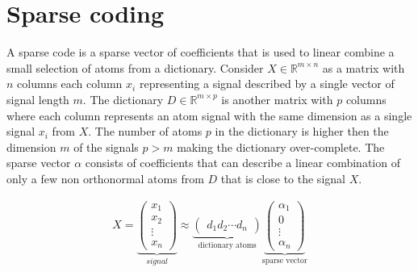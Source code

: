 \chapter{Sparse coding}
\label{chap:sparse_coding}


A sparse code is a sparse vector of coefficients that is used 
to linear combine a small selection of atoms from a dictionary.
Consider $X \in \mathbb{R}^{m\times n}$  as a matrix with $n$ columns each
column $x_{i}$ representing a signal described by a single vector of
signal length $m$. The dictionary $D\in\mathbb{R}^{m \times p}$ is another
matrix with $p$ columns where each column represents an atom signal with the
same dimension as a single signal $x_{i}$ from $X$. The number of 
atoms $p$ in the dictionary is higher then the dimension $m$ of the signals
$p > m$ making the dictionary over-complete. The sparse vector $\alpha$ consists
of coefficients that can describe a linear combination of only a few non
orthonormal atoms from $D$ that is close to the signal $X$. 

\begin{align}
X = \underbrace{\begin{pmatrix} x_1 \\ x_2 \\ \vdots \\ x_n
\end{pmatrix}}_{signal}
\approx \underbrace{\begin{pmatrix} d_1  d_2 \cdots d_n
\end{pmatrix}}_{\textrm{dictionary atoms}}
\underbrace{\begin{pmatrix} \alpha_1 \\ 0 \\ \vdots \\ \alpha_n
\end{pmatrix}}_{\textrm{sparse vector}}
\end{align}



